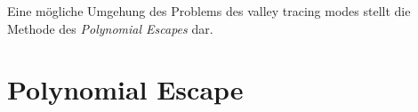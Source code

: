 Eine mögliche Umgehung des Problems des valley tracing modes stellt die Methode des \textit{Polynomial Escapes} dar.
\section{Polynomial Escape}








